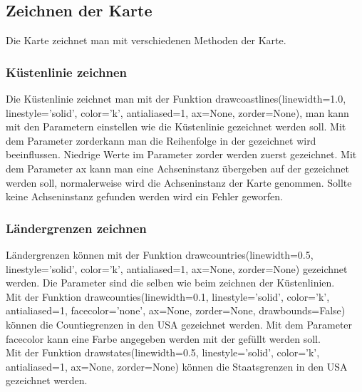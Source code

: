 \subsection{Zeichnen der Karte}
\label{sec:zeichnenkarte}
Die Karte zeichnet man mit verschiedenen Methoden der Karte.\\
\subsubsection*{Küstenlinie zeichnen}
Die Küstenlinie zeichnet man mit der Funktion \textsf{ drawcoastlines(linewidth=1.0, linestyle='solid', color='k', antialiased=1, ax=None, zorder=None)}, man kann mit den Parametern einstellen wie die Küstenlinie gezeichnet werden soll. Mit dem Parameter \textsf{zorder}kann man die Reihenfolge in der gezeichnet wird beeinflussen. Niedrige Werte im Parameter \textsf{zorder} werden zuerst gezeichnet.
Mit dem Parameter \textsf{ax} kann man eine Achseninstanz übergeben auf der gezeichnet werden soll, normalerweise wird die Achseninstanz der Karte genommen. Sollte keine Achseninstanz gefunden werden wird ein Fehler geworfen.\\
\subsubsection*{Ländergrenzen zeichnen}
Ländergrenzen können mit der Funktion \textsf{ drawcountries(linewidth=0.5, linestyle='solid', color='k', antialiased=1, ax=None, zorder=None)} gezeichnet werden. Die Parameter sind die selben wie beim zeichnen der Küstenlinien. \\
Mit der Funktion \textsf{drawcounties(linewidth=0.1, linestyle='solid', color='k', antialiased=1, facecolor='none', ax=None, zorder=None, drawbounds=False)} können die Countiegrenzen in den USA gezeichnet werden. Mit dem Parameter \textsf{facecolor} kann eine Farbe angegeben werden mit der gefüllt werden soll.\\
Mit der Funktion \textsf{drawstates(linewidth=0.5, linestyle='solid', color='k', antialiased=1, ax=None, zorder=None)} können die Staatsgrenzen in den USA gezeichnet werden.
